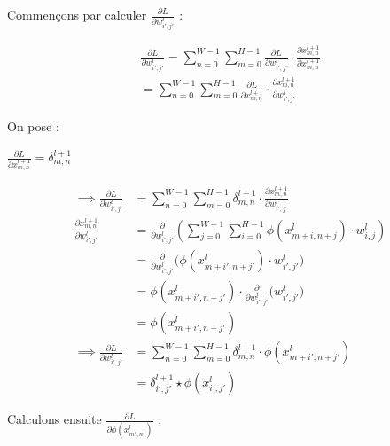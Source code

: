 \begin{multicols}{2}
Commençons par calculer $\frac{\partial L}{\partial w_{i',j'}^{l}}$ : 

{\scriptsize
\begin{align}
\frac{\partial L}{\partial w_{i',j'}^{l}} = \sum_{n=0}^{W-1}\sum_{m=0}^{H-1}\frac{\partial L}{\partial w_{i',j'}^{l}}\cdot\frac{\partial x_{m,n}^{l+1}}{\partial x_{m,n}^{l+1}}\\
= \sum_{n=0}^{W-1}\sum_{m=0}^{H-1}\frac{\partial L}{\partial x_{m,n}^{l+1}}\cdot\frac{\partial x_{m,n}^{l+1}}{\partial w_{i',j'}^{l}}
\end{align}}

On pose : 

$\frac{\partial{L}}{\partial{x_{m,n}^{l+1}}} = \delta^{l+1}_{m,n}$

{\scriptsize
\begin{align}
\implies \frac{\partial L}{\partial w_{i',j'}^{l}} &=  \sum_{n=0}^{W-1}\sum_{m=0}^{H-1}\delta^{l+1}_{m,n}\cdot\frac{\partial x_{m,n}^{l+1}}{\partial w_{i',j'}^{l}}\\
\frac{\partial x_{m,n}^{l+1}}{\partial w_{i',j'}^{l}}&= \frac{\partial}{\partial w_{i',j'}^{l}}\left(\sum_{j=0}^{W-1}\sum_{i=0}^{H-1}\phi(x^{l}_{m+i, n+j}) \cdot w^{l}_{i,j}\right)\\
&= \frac{\partial}{\partial w^{l}_{i',j'}}\big (\phi(x^{l}_{m+i', n+j'}) \cdot w^{l}_{i',j'}\big )\\
&= \phi(x^{l}_{m+i', n+j'}) \cdot \frac{\partial}{\partial w^{l}_{i',j'}}\big (w^{l}_{i',j'}\big )\\
&= \phi(x^{l}_{m+i',n+j'})\\
\implies \frac{\partial L}{\partial w_{i',j'}^{l}} &=  \sum_{n=0}^{W-1}\sum_{m=0}^{H-1}\delta^{l+1}_{m,n}\cdot\phi(x^{l}_{m+i',n+j'})\\
&= \delta^{l+1}_{i',j'} \star \phi(x^{l}_{i',j'})
\end{align}}

Calculons ensuite $\frac{\partial L}{\partial\phi\left(x^{l}_{m',n'}\right)}$ : 


\end{multicols}
